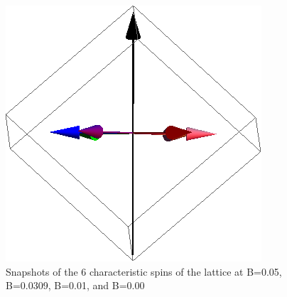 \documentclass{article}
\begin{document}
\begin{figure}[ht]
\includegraphics[scale=0.27]{111_2000/4S005to000G.png}
\caption{Snapshots of the 6 characteristic spins of the lattice at B=0.05, B=0.0309, B=0.01, and B=0.00}
\end{figure}
\clearpage
\end{document}
